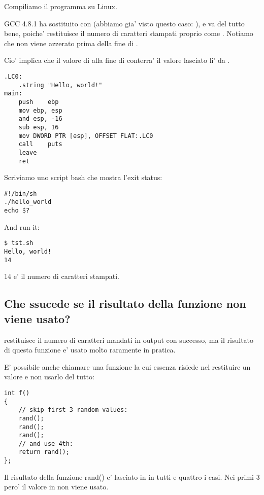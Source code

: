 Compiliamo il programma su Linux.

GCC 4.8.1 ha sostituito \printf con \puts 
(abbiamo gia' visto questo caso: ), e va del tutto bene, poiche' \puts restituisce il numero di caratteri stampati proprio come \printf.
Notiamo che \EAX non viene azzerato prima della fine di \main.

Cio' implica che il valore di \EAX alla fine di \main conterra' il valore lasciato li' da \puts.

\begin{lstlisting}[caption=GCC 4.8.1]
.LC0:
	.string	"Hello, world!"
main:
	push	ebp
	mov	ebp, esp
	and	esp, -16
	sub	esp, 16
	mov	DWORD PTR [esp], OFFSET FLAT:.LC0
	call	puts
	leave
	ret
\end{lstlisting}


Scriviamo uno script bash che mostra l'exit status:

\begin{lstlisting}[caption=tst.sh]
#!/bin/sh
./hello_world
echo $?
\end{lstlisting}

And run it:

\begin{lstlisting}
$ tst.sh 
Hello, world!
14
\end{lstlisting}

14 e' il numero di caratteri stampati.

\subsection{Che ssucede se il risultato della funzione non viene usato?}

\printf restituisce il numero di caratteri mandati in output con successo, ma il risultato di questa funzione
e' usato molto raramente in pratica.

E' possibile anche chiamare una funzione la cui essenza risiede nel restituire un valore e non usarlo del tutto:

\begin{lstlisting}
int f()
{
    // skip first 3 random values:
    rand();
    rand();
    rand();
    // and use 4th:
    return rand();
};
\end{lstlisting}

Il risultato della funzione rand() e' lasciato in \EAX in tutti e quattro i casi.
Nei primi 3 pero' il valore in \EAX non viene usato.

